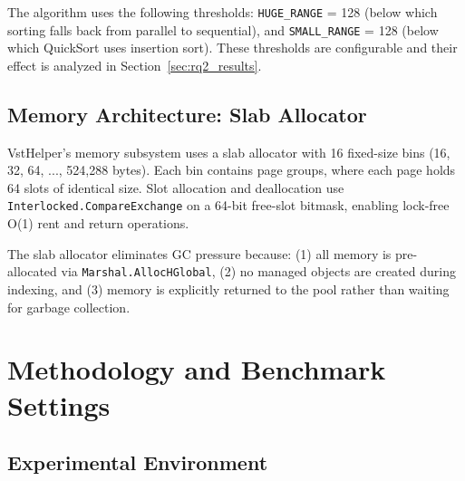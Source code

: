 \documentclass[conference]{IEEEtran}
\begin{document}
The algorithm uses the following thresholds: \texttt{HUGE\_RANGE} = 128 (below which sorting falls back from parallel to sequential), and \texttt{SMALL\_RANGE} = 128 (below which QuickSort uses insertion sort). These thresholds are configurable and their effect is analyzed in Section~\ref{sec:rq2_results}.

\subsection{Memory Architecture: Slab Allocator}
\label{sec:slab_allocator}

VstHelper's memory subsystem uses a slab allocator with 16 fixed-size bins (16, 32, 64, ..., 524,288 bytes). Each bin contains page groups, where each page holds 64 slots of identical size. Slot allocation and deallocation use \texttt{Interlocked.CompareExchange} on a 64-bit free-slot bitmask, enabling lock-free O(1) rent and return operations.

The slab allocator eliminates GC pressure because: (1) all memory is pre-allocated via \texttt{Marshal.AllocHGlobal}, (2) no managed objects are created during indexing, and (3) memory is explicitly returned to the pool rather than waiting for garbage collection.

\section{Methodology and Benchmark Settings}
\label{sec:methodology}

\subsection{Experimental Environment}
\label{sec:environment}
\end{document}
